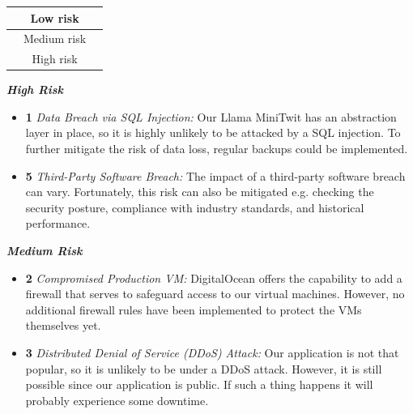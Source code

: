 \documentclass{article}
\begin{document}
\begin{table}[h!]
\centering
\small
{} 
\renewcommand{\arraystretch}{1.5} 
\begin{tabular}{|c|c|c|}
\hline
\cellcolor{lowrisk} & Low risk \\
\hline
\cellcolor{mediumrisk} & Medium risk \\
\hline
\cellcolor{highrisk} & High risk \\
\hline
\end{tabular}
\end{table} 

\pagebreak

\textit{\textbf{High Risk}}\vspace{0.2em}
\begin{itemize}
    \item \textbf{1} \textit{Data Breach via SQL Injection:} Our Llama MiniTwit has an abstraction layer in place, so it is highly unlikely to be attacked by a SQL injection. To further mitigate the risk of data loss, regular backups could be implemented.
    \item \textbf{5} \textit{Third-Party Software Breach:} The impact of a third-party software breach can vary. Fortunately, this risk can also be mitigated e.g. checking the security posture, compliance with industry standards, and historical performance.
\end{itemize}

\vspace{0.4em}
\textit{\textbf{Medium Risk}}\vspace{0.2em}
\begin{itemize}
    \item \textbf{2} \textit{Compromised Production VM:} DigitalOcean offers the capability to add a firewall that serves to safeguard access to our virtual machines. However, no additional firewall rules have been implemented to protect the VMs themselves yet.
    \item \textbf{3} \textit{Distributed Denial of Service (DDoS) Attack:} Our application is not that popular, so it is unlikely to be under a DDoS attack. However, it is still possible since our application is public. If such a thing happens it will probably experience some downtime.
\end{itemize}
\end{document}
